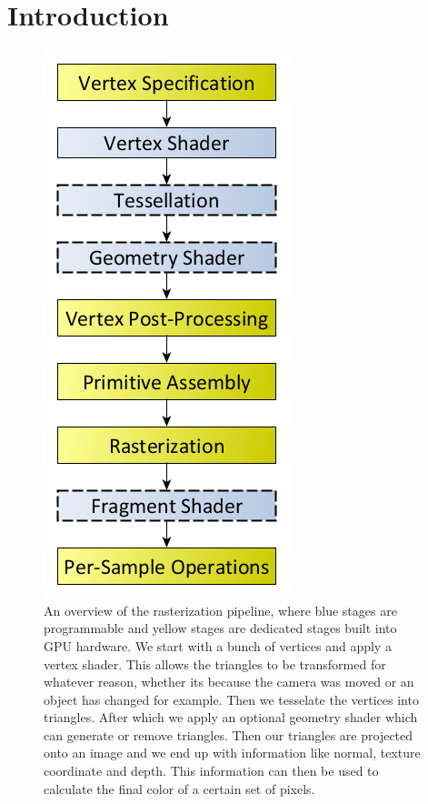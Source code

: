 \section{Introduction} \label{introduction}

\begin{figure}
    \centering
    \includegraphics[width=0.5\linewidth]{figures/rasterization_pipeline.png}
    \caption{An overview of the rasterization pipeline, where blue stages are programmable and yellow stages are dedicated stages built into GPU hardware. We start with a bunch of vertices and apply a vertex shader. This allows the triangles to be transformed for whatever reason, whether its because the camera was moved or an object has changed for example. Then we tesselate the vertices into triangles. After which we apply an optional geometry shader which can generate or remove triangles. Then our triangles are projected onto an image and we end up with information like normal, texture coordinate and depth. This information can then be used to calculate the final color of a certain set of pixels. \cite{RasterPipeline}}
    \label{fig:rasterization_pipeline}
\end{figure}







